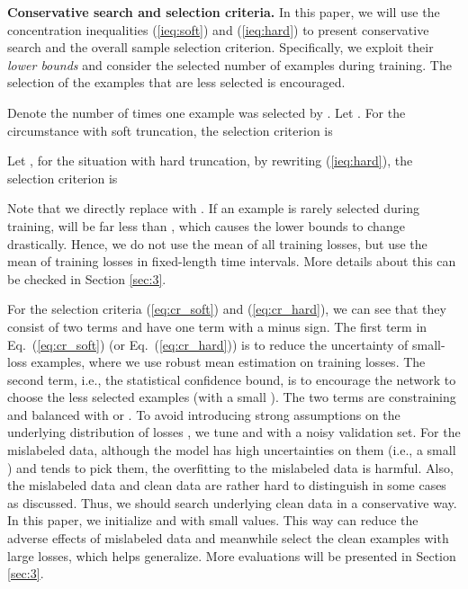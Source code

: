 \documentclass[11pt]{article}
\begin{document}
\textbf{Conservative search and selection criteria.} In this paper, we will use the concentration inequalities (\ref{ieq:soft}) and (\ref{ieq:hard}) to present conservative search and the overall sample selection criterion. Specifically, we exploit their \textit{lower bounds} and consider the selected number of examples during training. The selection of the examples that are less selected is encouraged. 

Denote the number of times one example was selected by . Let . For the circumstance with soft truncation, the selection criterion is
\vspace{-2pt}

\vspace{-2pt}
Let , for the situation with hard truncation, by rewriting (\ref{ieq:hard}), the selection criterion is

Note that we directly replace  with . If an example is rarely selected during training,  will be far less than , which causes the lower bounds to change drastically. Hence, we do not use the mean of all training losses, but use the mean of training losses in fixed-length time intervals. More details about this can be checked in Section \ref{sec:3}. 

For the selection criteria (\ref{eq:cr_soft}) and (\ref{eq:cr_hard}), we can see that they consist of two terms and have one term with a minus sign. The first term in Eq.~(\ref{eq:cr_soft}) (or Eq.~(\ref{eq:cr_hard})) is to reduce the uncertainty of small-loss examples, where we use robust mean estimation on training losses. The second term, i.e., the statistical confidence bound, is to encourage the network to choose the less selected examples (with a small ). The two terms are constraining and balanced with  or . To avoid introducing strong assumptions on the underlying distribution of losses \citep{chakrabarty2012understanding}, we tune  and  with a noisy validation set. For the mislabeled data, although the model has high uncertainties on them (i.e., a small ) and tends to pick them, the overfitting to the mislabeled data is harmful. Also, the mislabeled data and clean data are rather hard to distinguish in some cases as discussed. Thus, we should search underlying clean data in a conservative way. In this paper, we initialize  and  with small values. This way can reduce the adverse effects of mislabeled data and meanwhile select the clean examples with large losses, which helps generalize. More evaluations will be presented in Section \ref{sec:3}.
\end{document}
